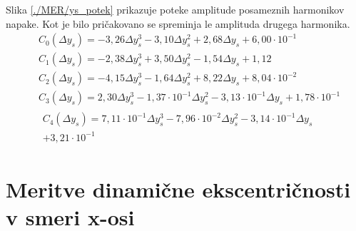 Slika \ref{./MER/ys_potek} prikazuje poteke amplitude posameznih harmonikov napake. Kot je bilo pričakovano se spreminja le amplituda drugega harmonika. 
\begin{eqnarray}
&C_0(\Delta y_s) =-3,26\Delta y_s^{3}-3,10\Delta y_s^{2}+2,68\Delta y_s+6,00\cdot 10^{-1} \\                                      
&C_1(\Delta y_s) =-2,38\Delta y_s^{3}+3,50\Delta y_s^{2}-1,54\Delta y_s+1,12 \\                                                   
&C_2(\Delta y_s) =-4,15\Delta y_s^{3}-1,64\Delta y_s^{2}+8,22\Delta y_s+8,04\cdot 10^{-2} \\                                      
&C_3(\Delta y_s) =2,30\Delta y_s^{3}-1,37\cdot 10^{-1}\Delta y_s^{2}-3,13\cdot 10^{-1}\Delta y_s+1,78\cdot 10^{-1} \\             
&\begin{split}C_4(\Delta y_s) =7,11\cdot 10^{-1}\Delta y_s^{3}-7,96\cdot 10^{-2}\Delta y_s^{2}-3,14\cdot 10^{-1}\Delta y_s\\+3,21\cdot 10^{-1}\end{split}
\end{eqnarray}
\section{Meritve dinamične ekscentričnosti v smeri x-osi}

